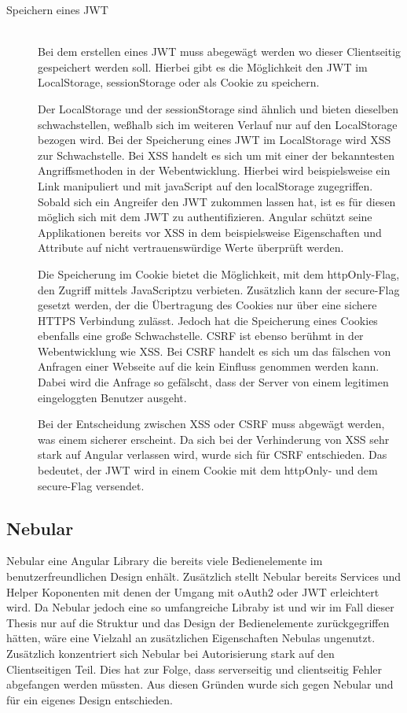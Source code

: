 \documentclass[paper=a4,fontsize=12pt,parskip=half]{scrartcl}
\newcommand{\JS}{JavaScript}
\begin{document}
	\begin{description}
		\item[Speichern eines \gls{JWT}]\hfill\\
		Bei dem erstellen eines \gls{JWT} muss abegewägt werden wo dieser Clientseitig gespeichert werden soll. Hierbei gibt es die Möglichkeit den \gls{JWT} im LocalStorage, sessionStorage oder als Cookie zu speichern.

		Der LocalStorage und der sessionStorage sind ähnlich und bieten dieselben schwachstellen, weßhalb sich im weiteren Verlauf nur auf den LocalStorage bezogen wird. Bei der Speicherung eines \gls{JWT} im LocalStorage wird \gls{XSS} zur Schwachstelle. Bei \gls{XSS} handelt es sich um mit einer der bekanntesten Angriffsmethoden in der Webentwicklung. Hierbei wird beispielsweise ein Link manipuliert und mit javaScript auf den localStorage zugegriffen. Sobald sich ein Angreifer den \gls{JWT} zukommen lassen hat, ist es für diesen möglich sich mit dem \gls{JWT} zu authentifizieren. Angular schützt seine Applikationen bereits vor \gls{XSS} in dem beispielsweise Eigenschaften und Attribute auf nicht vertrauenswürdige Werte überprüft werden.

		Die Speicherung im Cookie bietet die Möglichkeit, mit dem httpOnly-Flag, den Zugriff mittels \JS  zu verbieten. Zusätzlich kann der secure-Flag gesetzt werden, der die Übertragung des Cookies nur über eine sichere \gls{HTTPS} Verbindung zulässt. Jedoch hat die Speicherung eines Cookies ebenfalls eine große Schwachstelle. \gls{CSRF} ist ebenso berühmt in der Webentwicklung wie \gls{XSS}. Bei \gls{CSRF} handelt es sich um das fälschen von Anfragen einer Webseite auf die kein Einfluss genommen werden kann. Dabei wird die Anfrage so gefälscht, dass der Server von einem legitimen eingeloggten Benutzer ausgeht.

		Bei der Entscheidung zwischen \gls{XSS} oder \gls{CSRF} muss abgewägt werden, was einem sicherer erscheint. Da sich bei der Verhinderung von \gls{XSS} sehr stark auf Angular verlassen wird, wurde sich für \gls{CSRF} entschieden. Das bedeutet, der \gls{JWT} wird in einem Cookie mit dem httpOnly- und dem secure-Flag versendet.
	\end{description}

	\subsection{Nebular}
	\label{sec: nebular}
	Nebular eine Angular Library die bereits viele Bedienelemente im benutzerfreundlichen Design enhält. Zusätzlich stellt Nebular bereits Services und Helper Koponenten mit denen der Umgang mit \gls{oAuth2} oder \gls{JWT} erleichtert wird. Da Nebular jedoch eine so umfangreiche Libraby ist und wir im Fall dieser Thesis nur auf die Struktur und das Design der Bedienelemente zurückgegriffen hätten, wäre eine Vielzahl an zusätzlichen Eigenschaften Nebulas ungenutzt. Zusätzlich konzentriert sich Nebular bei Autorisierung stark auf den Clientseitigen Teil. Dies hat zur Folge, dass serverseitig und clientseitig Fehler abgefangen werden müssten. Aus diesen Gründen wurde sich gegen Nebular und für ein eigenes Design entschieden.
\end{document}
